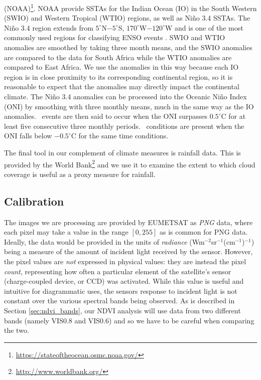 (NOAA)\footnote{\url{https://stateoftheocean.osmc.noaa.gov/}}. NOAA provide
SSTAs for the Indian Ocean (IO) in the South Western (SWIO) and Western Tropical
(WTIO) regions, as well as Ni{\~n}o 3.4 SSTAs. The Ni{\~n}o 3.4 region extends
from $5^{\circ}$N$-5^{\circ}$S, $170^{\circ}$W$-120^{\circ}$W and is one of the most commonly
used regions for classifying ENSO events \citep{trenberth1997}. SWIO and WTIO
anomalies are smoothed by taking three month means, and the SWIO anomalies are
compared to the data for South Africa while the WTIO anomalies are compared to
East Africa. We use the anomalies in this way because each IO region is in close
proximity to its corresponding continental region, so it is reasonable to expect
that the anomalies may directly impact the continental climate. The Ni{\~n}o 3.4
anomalies can be processed into the Oceanic Ni{\~n}o Index (ONI) by smoothing
with three monthly means, much in the same way as the IO
anomalies. \elnino\ events are then said to occur when the ONI surpasses
$0.5^{\circ}$C for at least five consecutive three monthly
periods. \nina\ conditions are present when the ONI falls below $-0.5^{\circ}$C for
the same time conditions.

The final tool in our complement of climate measures is rainfall
data. This is provided by the World
Bank\footnote{\url{http://www.worldbank.org/}} and we use it to
examine the extent to which cloud coverage is useful as a proxy
measure for rainfall.

\subsection{Calibration}
\label{sec:data:calib}

The images we are processing are provided by EUMETSAT as \emph{PNG} data, where
each pixel may take a value in the range $\left[0, 255\right]$ as is common for
PNG data. Ideally, the data would be provided in the units of \emph{radiance}
(Wm$^{-2}$sr$^{-1}$(cm$^{-1}$)$^{-1}$) being a measure of the amount of incident
light received by the sensor. However, the pixel values are \emph{not} expressed
in physical values: they are instead the pixel \emph{count}, representing how
often a particular element of the satellite's sensor (charge-coupled device, or
CCD) was activated. While this value is useful and intuitive for diagrammatic
uses, the sensors response to incident light is not constant over the various
spectral bands being observed. As is described in Section \ref{sec:ndvi_bands},
our NDVI analysis will use data from two different bands (namely VIS0.8 and
VIS0.6) and so we have to be careful when comparing the two.

